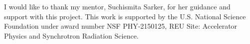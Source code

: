 \documentclass[twocolumn, nofootinbib, secnumarabic, amssymb, nobibnotes, aps, prd]{revtex4-2}
\begin{document}
\begin{acknowledgments}
I would like to thank my mentor, Suchismita Sarker, for her guidance and support with this project. This work is supported by the U.S. National Science Foundation under award number NSF PHY-2150125, REU Site: Accelerator Physics and Synchrotron Radiation Science.
\end{acknowledgments}

\clearpage



\end{document}
